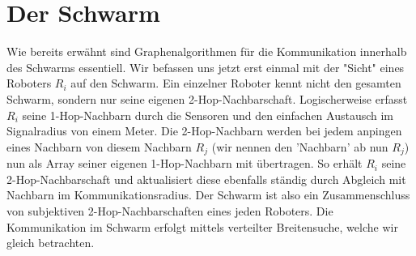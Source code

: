 \section{Der Schwarm}

Wie bereits erwähnt sind Graphenalgorithmen für die Kommunikation innerhalb des Schwarms essentiell.
Wir befassen uns jetzt erst einmal mit der "Sicht" eines Roboters $R_i$ auf den Schwarm. Ein einzelner 
Roboter kennt nicht den gesamten Schwarm, sondern nur seine eigenen 2-Hop-Nachbarschaft. Logischerweise
erfasst $R_i$ seine 1-Hop-Nachbarn durch die Sensoren und den einfachen Austausch im Signalradius von 
einem Meter. Die 2-Hop-Nachbarn werden bei jedem anpingen eines Nachbarn von diesem Nachbarn $R_j$ (wir
nennen den 'Nachbarn' ab nun $R_j$) nun als Array seiner eigenen 1-Hop-Nachbarn mit übertragen.
So erhält $R_i$ seine 2-Hop-Nachbarschaft und aktualisiert diese ebenfalls ständig durch Abgleich mit
Nachbarn im Kommunikationsradius. Der Schwarm ist also ein Zusammenschluss von subjektiven 
2-Hop-Nachbarschaften eines jeden Roboters. Die Kommunikation im Schwarm erfolgt mittels verteilter
Breitensuche, welche wir gleich betrachten.